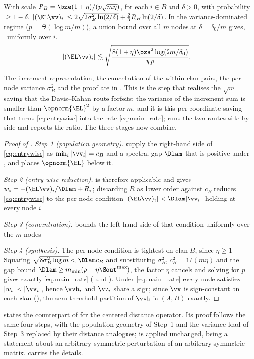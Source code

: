 \begin{lemma}\label{lem:pernode}
With scale $R_B=\bze(1+\eta)/(p\sqrt{m\eta})$, for each $i\in B$ and $\delta>0$,
with probability $\ge1-\delta$,
$|(\EL\vv)_i|\le2\sqrt{2\sigma_B^2\ln(2/\delta)}+\tfrac23R_B\ln(2/\delta)$. In the
variance-dominated regime ($p=\Theta(\log m/m)$), a union bound over all $m$ nodes
at $\delta=\delta_0/m$ gives, \hp\ uniformly over $i$,
\begin{equation}\label{eq:concentration-bound}
   |(\EL\vv)_i|\lesssim\sqrt{\frac{8(1+\eta)\bze^2\log(2m/\delta_0)}{\eta\,p}}.
\end{equation}
\end{lemma}
\noindent The increment representation, the cancellation of the within-clan
pairs, the per-node variance $\sigma_B^2$ and the proof are in
. This is the step that realises the $\sqrt m$ saving that the
Davis--Kahan route forfeits: the variance of the increment sum is smaller than
$\opnorm{\EL}^2$ by a factor $m$, and it is this per-coordinate saving that turns
\eqref{eq:entrywise} into the rate \eqref{eq:main_rate};  runs
the two routes side by side and  reports the ratio. The three
stages now combine.

\begin{proof}[Proof of ]
\emph{Step 1 (population geometry).}  supply the
right-hand side of \eqref{eq:entrywise} as $\min_i|\vv_i|=c_B$ and a spectral gap
$\Dlam$ that is positive under , and 
places $\opnorm{\EL}$ below it.

\emph{Step 2 (entry-wise reduction).}  is therefore applicable
and gives $w_i=-(\EL\vv)_i/\Dlam+R_i$; discarding $R$ as lower order against
$c_B$ reduces \eqref{eq:entrywise} to the per-node condition
$|(\EL\vv)_i|<\Dlam|\vv_i|$ holding at every node $i$.

\emph{Step 3 (concentration).}  bounds the left-hand side of
that condition uniformly over the $m$ nodes.

\emph{Step 4 (synthesis).} The per-node condition is tightest on clan $B$, since
$\eta\ge1$. Squaring $\sqrt{8\sigma_B^2\log m}<\Dlam c_B$ and substituting
$\sigma_B^2$, $c_B^2=1/(m\eta)$ and the gap bound
$\Dlam\ge m_{\min}(\rho-\eta\Sout^{\max})$, the factor $\eta$ cancels and solving
for $p$ gives exactly \eqref{eq:main_rate}
( and ). Under \eqref{eq:main_rate} every node satisfies
$|w_i|<|\vv_i|$, hence $\vvh_i$ and $\vv_i$ share a sign; since $\vv$ is
sign-constant on each clan (), the zero-threshold partition of
$\vvh$ is $(A,B)$ exactly.
\end{proof}

 states the counterpart of  for the centered
distance operator. Its proof follows the same four steps, with the population
geometry of Step~1 and the variance load of Step~3 replaced by their distance
analogues; 
is applied unchanged, being a statement about an arbitrary symmetric perturbation
of an arbitrary symmetric matrix.  carries the details.
